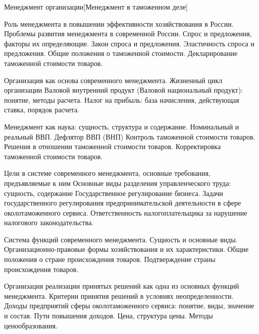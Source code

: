 \documentclass[
	11pt,
	a4paper,
	]
	{article}
\begin{document}
 {Менеджмент организации}[Менеджмент в таможенном деле]

	

\noindent{} 
	{
		Роль менеджмента в повышении эффективности хозяйствования в России. Проблемы развития менеджмента в современной России.
	}{
		Спрос и предложения, факторы их определяющие. Закон спроса и предложения. Эластичность спроса и предложения.
	}{
		Общие положения о таможенной стоимости. Декларирование таможенной стоимости товаров.
	}

\bigskip

\noindent{} 
	{
		Организация как основа современного менеджмента. Жизненный цикл организации
	}{
		Валовой внутренний продукт (Валовой национальный продукт): понятие, методы расчета.
	}{
		Налог на прибыль: база начисления, действующая ставка, порядок расчета.
	}

\bigskip

\noindent{} 
	{
		Менеджмент как наука: сущность, структура и содержание.
	}{
		Номинальный и реальный ВВП. Дефлятор ВВП (ВНП)
	}{
		Контроль таможенной стоимости товаров. Решения в отношении таможенной стоимости товаров. Корректировка таможенной стоимости товаров.
	}

\bigskip

\noindent{} 
	{
		Цели в системе современного менеджмента, основные требования, предъявляемые к ним Основные виды разделения управленческого труда: сущность, содержание
	}{
		Государственное регулирование бизнеса. Задачи государственного регулирования предпринимательской деятельности в сфере околотаможенного сервиса.
	}{
		Ответственность налогоплательщика за нарушение налогового законодательства.
	}

\bigskip

\noindent{} 
	{
		Система функций современного менеджмента. Сущность и основные виды.
	}{
		Организационно-правовые формы хозяйствования и их характеристики.
	}{
		Общие положения о стране происхождения товаров. Подтверждение страны происхождения товаров.
	}

\bigskip

\noindent{} 
	{
		Организация реализации принятых решений как одна из основных функций менеджмента. Критерии принятия решений в условиях неопределенности.
	}{
		Доходы предприятий сферы околотаможенного сервиса: понятие, виды, значение и состав. Пути повышения доходов.
	}{
		Цена, структура цены. Методы ценообразования.
	}

\bigskip
\end{document}
